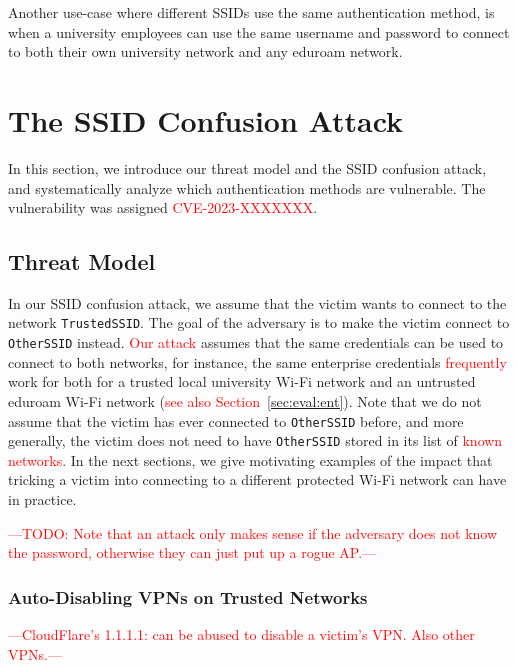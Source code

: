 \documentclass[sigconf,review,anonymous]{acmart}
\newcommand{\wifi}{\mbox{Wi-Fi}}
\DeclareRobustCommand{\red}[1]{\textcolor{red}{#1}}
\begin{document}
Another use-case where different SSIDs use the same authentication method, is when a university employees can use the same username and password to connect to both their own university network and any eduroam network.


\section{The SSID Confusion Attack}
\label{sec:attack}

In this section, we introduce our threat model and the SSID confusion attack, and systematically analyze which authentication methods are vulnerable.
The vulnerability was assigned \red{CVE-2023-XXXXXXX}.

\subsection{Threat Model}

In our SSID confusion attack, we assume that the victim wants to connect to the network \verb|TrustedSSID|.
The goal of the adversary is to make the victim connect to \verb|OtherSSID| instead.
\red{Our attack} assumes that the same credentials can be used to connect to both networks, for instance,
the same enterprise credentials \red{frequently} work for both for a trusted local university \wifi{} network and an untrusted eduroam \wifi{} network (\red{see also Section~\ref{sec:eval:ent}}).
Note that we do not assume that the victim has ever connected to \verb|OtherSSID| before, and more generally, the victim does not need to have \verb|OtherSSID| stored in its list of \red{known networks}.
In the next sections, we give motivating examples of the impact that tricking a victim into connecting to a different protected \wifi{} network can have in practice.

\red{---TODO: Note that an attack only makes sense if the adversary does not know the password, otherwise they can just put up a rogue AP.---}

\subsubsection{Auto-Disabling VPNs on Trusted Networks}

\red{---CloudFlare's 1.1.1.1: can be abused to disable a victim's VPN. Also other VPNs.---}
\end{document}
